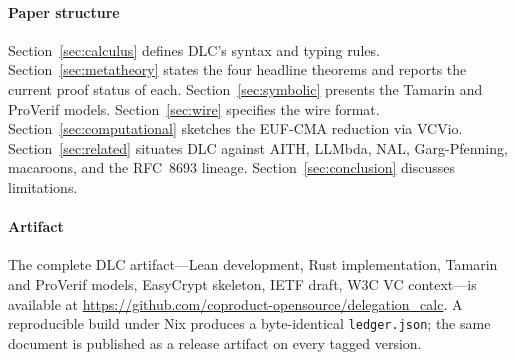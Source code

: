 \paragraph{Paper structure}

Section~\ref{sec:calculus} defines DLC's syntax and typing rules.
Section~\ref{sec:metatheory} states the four headline theorems and
reports the current proof status of each.  Section~\ref{sec:symbolic}
presents the Tamarin and ProVerif models.  Section~\ref{sec:wire}
specifies the wire format.  Section~\ref{sec:computational} sketches
the EUF-CMA reduction via VCVio.  Section~\ref{sec:related} situates
DLC against AITH, LLMbda, NAL, Garg-Pfenning, macaroons, and the
RFC~8693 lineage.  Section~\ref{sec:conclusion} discusses limitations.

\paragraph{Artifact}

The complete DLC artifact---Lean development, Rust implementation,
Tamarin and ProVerif models, EasyCrypt skeleton, IETF draft, W3C VC
context---is available at
\url{https://github.com/coproduct-opensource/delegation_calc}.  A
reproducible build under Nix produces a byte-identical
\texttt{ledger.json}; the same document is published as a release
artifact on every tagged version.
